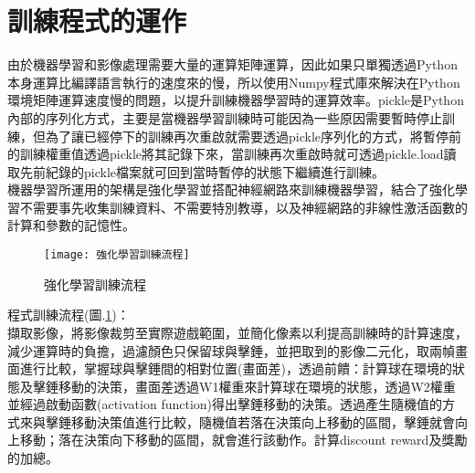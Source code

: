 \section{訓練程式的運作}
 由於機器學習和影像處理需要大量的運算矩陣運算，因此如果只單獨透過Python本身運算比編譯語言執行的速度來的慢，所以使用Numpy程式庫來解決在Python環境矩陣運算速度慢的問題，以提升訓練機器學習時的運算效率。pickle是Python內部的序列化方式，主要是當機器學習訓練時可能因為一些原因需要暫時停止訓練，但為了讓已經停下的訓練再次重啟就需要透過pickle序列化的方式，將暫停前的訓練權重值透過pickle將其記錄下來，當訓練再次重啟時就可透過pickle.load讀取先前紀錄的pickle檔案就可回到當時暫停的狀態下繼續進行訓練。\\
 
 機器學習所運用的架構是強化學習並搭配神經網路來訓練機器學習，結合了強化學習不需要事先收集訓練資料、不需要特別教導，以及神經網路的非線性激活函數的計算和參數的記憶性。\\
\begin{figure}[hbt!]
\begin{center}
\texttt{[image: 強化學習訓練流程]}
\caption{\Large 強化學習訓練流程}
\label{fig.強化學習程式流程}
\end{center}
\end{figure}

程式訓練流程(圖.\ref{fig.強化學習程式流程})：\\
 擷取影像，將影像裁剪至實際遊戲範圍，並簡化像素以利提高訓練時的計算速度，減少運算時的負擔，過濾顏色只保留球與擊錘，並把取到的影像二元化，取兩幀畫面進行比較，掌握球與擊錘間的相對位置(畫面差)，透過前饋：計算球在環境的狀態及擊錘移動的決策，畫面差透過W1權重來計算球在環境的狀態，透過W2權重並經過啟動函數(activation function)得出擊錘移動的決策。透過產生隨機值的方式來與擊錘移動決策值進行比較，隨機值若落在決策向上移動的區間，擊錘就會向上移動；落在決策向下移動的區間，就會進行該動作。計算discount reward及獎勵的加總。\\

